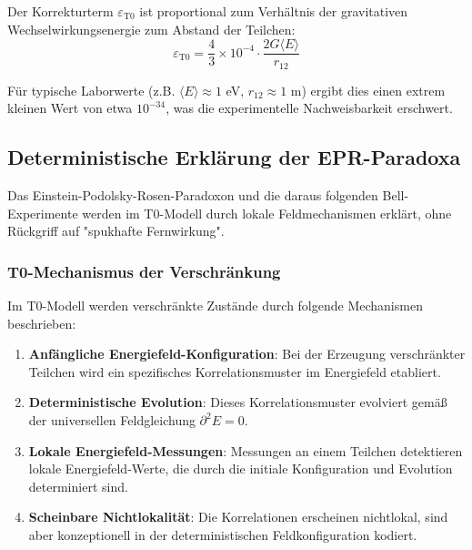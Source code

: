 \documentclass[12pt,a4paper]{article}
\newcommand{\epst}{\varepsilon_{\text{T0}}}
\theoremstyle{definition}
\begin{document}
	\begin{verhaltnis}
		Der Korrekturterm $\epst$ ist proportional zum Verhältnis der gravitativen Wechselwirkungsenergie zum Abstand der Teilchen:
		\begin{equation}
			\epst = \frac{4}{3} \times 10^{-4} \cdot \frac{2G\langle E \rangle}{r_{12}}
		\end{equation}
		
		Für typische Laborwerte (z.B. $\langle E \rangle \approx 1$ eV, $r_{12} \approx 1$ m) ergibt dies einen extrem kleinen Wert von etwa $10^{-34}$, was die experimentelle Nachweisbarkeit erschwert.
	\end{verhaltnis}
	
	\subsection{Deterministische Erklärung der EPR-Paradoxa}
	
	Das Einstein-Podolsky-Rosen-Paradoxon und die daraus folgenden Bell-Experimente werden im T0-Modell durch lokale Feldmechanismen erklärt, ohne Rückgriff auf "spukhafte Fernwirkung".
	
	\subsubsection{T0-Mechanismus der Verschränkung}
	
	Im T0-Modell werden verschränkte Zustände durch folgende Mechanismen beschrieben:
	
	\begin{enumerate}
		\item \textbf{Anfängliche Energiefeld-Konfiguration}: Bei der Erzeugung verschränkter Teilchen wird ein spezifisches Korrelationsmuster im Energiefeld etabliert.
		
		\item \textbf{Deterministische Evolution}: Dieses Korrelationsmuster evolviert gemäß der universellen Feldgleichung $\partial^2 E = 0$.
		
		\item \textbf{Lokale Energiefeld-Messungen}: Messungen an einem Teilchen detektieren lokale Energiefeld-Werte, die durch die initiale Konfiguration und Evolution determiniert sind.
		
		\item \textbf{Scheinbare Nichtlokalität}: Die Korrelationen erscheinen nichtlokal, sind aber konzeptionell in der deterministischen Feldkonfiguration kodiert.
	\end{enumerate}
	
\end{document}
